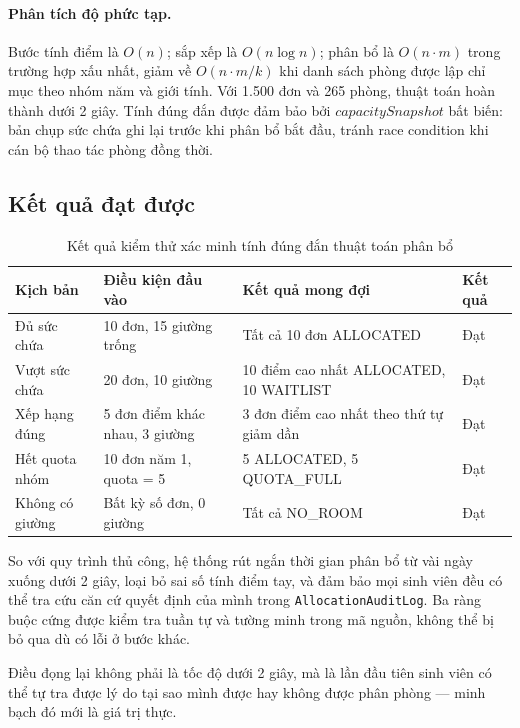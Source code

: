 \documentclass[../DoAn.tex]{subfiles}
\begin{document}
\medskip
\paragraph{Phân tích độ phức tạp.}
Bước tính điểm là $O(n)$; sắp xếp là $O(n \log n)$; phân bổ là $O(n \cdot m)$
trong trường hợp xấu nhất, giảm về $O(n \cdot m/k)$ khi danh sách phòng được
lập chỉ mục theo nhóm năm và giới tính. Với 1.500 đơn và 265 phòng, thuật toán
hoàn thành dưới 2 giây. Tính đúng đắn được đảm bảo bởi $capacitySnapshot$ bất
biến: bản chụp sức chứa ghi lại trước khi phân bổ bắt đầu, tránh race condition
khi cán bộ thao tác phòng đồng thời.

\subsection{Kết quả đạt được}
\label{subsec:alloc_result}

\begin{table}[H]
\centering
\caption{Kết quả kiểm thử xác minh tính đúng đắn thuật toán phân bổ}
\label{tab:alloc_verification}
\small
\begin{tabular}{|p{3.0cm}|p{3.6cm}|p{3.8cm}|p{1.8cm}|}
\hline
\textbf{Kịch bản} & \textbf{Điều kiện đầu vào} & \textbf{Kết quả mong đợi} & \textbf{Kết quả} \\
\hline
Đủ sức chứa & 10 đơn, 15 giường trống & Tất cả 10 đơn ALLOCATED & Đạt \\
\hline
Vượt sức chứa & 20 đơn, 10 giường & 10 điểm cao nhất ALLOCATED, 10 WAITLIST & Đạt \\
\hline
Xếp hạng đúng & 5 đơn điểm khác nhau, 3 giường & 3 đơn điểm cao nhất theo thứ tự giảm dần & Đạt \\
\hline
Hết quota nhóm & 10 đơn năm 1, quota = 5 & 5 ALLOCATED, 5 QUOTA\_FULL & Đạt \\
\hline
Không có giường & Bất kỳ số đơn, 0 giường & Tất cả NO\_ROOM & Đạt \\
\hline
\end{tabular}
\end{table}

So với quy trình thủ công, hệ thống rút ngắn thời gian phân bổ từ vài ngày
xuống dưới 2 giây, loại bỏ sai số tính điểm tay, và đảm bảo mọi sinh viên
đều có thể tra cứu căn cứ quyết định của mình trong \texttt{AllocationAuditLog}.
Ba ràng buộc cứng được kiểm tra tuần tự và tường minh trong mã nguồn, không
thể bị bỏ qua dù có lỗi ở bước khác.

Điều đọng lại không phải là tốc độ dưới 2 giây, mà là lần đầu tiên sinh viên
có thể tự tra được lý do tại sao mình được hay không được phân phòng ---
minh bạch đó mới là giá trị thực.
\end{document}

